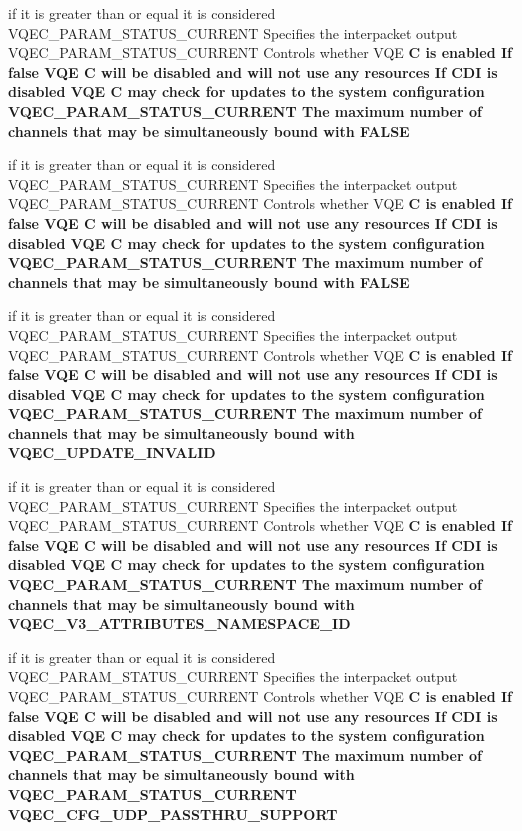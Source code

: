 \begin{CompactItemize}
\item 
if it is greater than or equal it is considered VQEC\_\-PARAM\_\-STATUS\_\-CURRENT Specifies the interpacket output VQEC\_\-PARAM\_\-STATUS\_\-CURRENT Controls whether VQE \bf{C} is enabled If false VQE \bf{C} will be disabled and will not use any resources If CDI is disabled VQE \bf{C} may check for updates \bf{to} the system configuration VQEC\_\-PARAM\_\-STATUS\_\-CURRENT The maximum number of \bf{channels} that may be simultaneously bound with \bf{FALSE}
\item 
if it is greater than or equal it is considered VQEC\_\-PARAM\_\-STATUS\_\-CURRENT Specifies the interpacket output VQEC\_\-PARAM\_\-STATUS\_\-CURRENT Controls whether VQE \bf{C} is enabled If false VQE \bf{C} will be disabled and will not use any resources If CDI is disabled VQE \bf{C} may check for updates \bf{to} the system configuration VQEC\_\-PARAM\_\-STATUS\_\-CURRENT The maximum number of \bf{channels} that may be simultaneously bound with \bf{FALSE}
\item 
if it is greater than or equal it is considered VQEC\_\-PARAM\_\-STATUS\_\-CURRENT Specifies the interpacket output VQEC\_\-PARAM\_\-STATUS\_\-CURRENT Controls whether VQE \bf{C} is enabled If false VQE \bf{C} will be disabled and will not use any resources If CDI is disabled VQE \bf{C} may check for updates \bf{to} the system configuration VQEC\_\-PARAM\_\-STATUS\_\-CURRENT The maximum number of \bf{channels} that may be simultaneously bound with \bf{VQEC\_\-UPDATE\_\-INVALID}
\item 
if it is greater than or equal it is considered VQEC\_\-PARAM\_\-STATUS\_\-CURRENT Specifies the interpacket output VQEC\_\-PARAM\_\-STATUS\_\-CURRENT Controls whether VQE \bf{C} is enabled If false VQE \bf{C} will be disabled and will not use any resources If CDI is disabled VQE \bf{C} may check for updates \bf{to} the system configuration VQEC\_\-PARAM\_\-STATUS\_\-CURRENT The maximum number of \bf{channels} that may be simultaneously bound with \bf{VQEC\_\-V3\_\-ATTRIBUTES\_\-NAMESPACE\_\-ID}
\item 
if it is greater than or equal it is considered VQEC\_\-PARAM\_\-STATUS\_\-CURRENT Specifies the interpacket output VQEC\_\-PARAM\_\-STATUS\_\-CURRENT Controls whether VQE \bf{C} is enabled If false VQE \bf{C} will be disabled and will not use any resources If CDI is disabled VQE \bf{C} may check for updates \bf{to} the system configuration VQEC\_\-PARAM\_\-STATUS\_\-CURRENT The maximum number of \bf{channels} that may be simultaneously bound with VQEC\_\-PARAM\_\-STATUS\_\-CURRENT \bf{VQEC\_\-CFG\_\-UDP\_\-PASSTHRU\_\-SUPPORT}

\end{CompactItemize}
